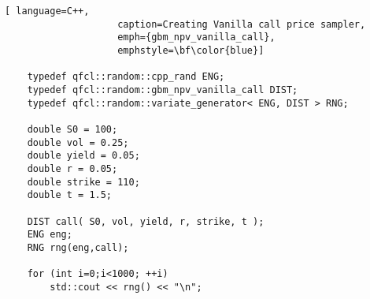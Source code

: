 \begin{lstlisting}[ language=C++,
                    caption=Creating Vanilla call price sampler,
                    emph={gbm_npv_vanilla_call},
                    emphstyle=\bf\color{blue}]
    
    typedef qfcl::random::cpp_rand ENG;
    typedef qfcl::random::gbm_npv_vanilla_call DIST;
    typedef qfcl::random::variate_generator< ENG, DIST > RNG;
    
    double S0 = 100;
    double vol = 0.25;
    double yield = 0.05;
    double r = 0.05; 
    double strike = 110;
    double t = 1.5;
    
    DIST call( S0, vol, yield, r, strike, t );
    ENG eng;
    RNG rng(eng,call);
    
    for (int i=0;i<1000; ++i) 
    	std::cout << rng() << "\n";
\end{lstlisting}
